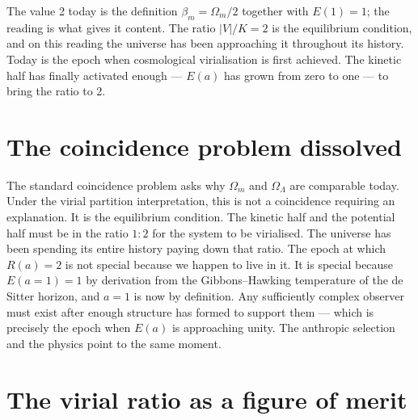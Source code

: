 The value 2 today is the definition $\beta_m=\Omega_m/2$ together with $E(1)=1$; the reading is what gives it content. The ratio $|V|/K=2$ is the
equilibrium condition, and on this reading the universe has been approaching it throughout its history. Today is the epoch when cosmological
virialisation is first achieved. The kinetic half has finally activated enough --- $E(a)$ has grown from zero to one --- to bring the ratio to 2. \interp

\section{The coincidence problem dissolved}\label{sec:vp_coincidence}
The standard coincidence problem asks why $\Omega_m$ and $\Omega_\Lambda$ are comparable today. Under the virial partition interpretation, this is not a
coincidence requiring an explanation. It is the equilibrium condition. The kinetic half and the potential half must be in the ratio $1:2$ for the system to
be virialised. The universe has been spending its entire history paying down that ratio. The epoch at which $R(a)=2$ is not special because we happen to
live in it. It is special because $E(a{=}1)=1$ by derivation from the Gibbons--Hawking temperature of the de Sitter horizon, and $a=1$ is now by
definition. Any sufficiently complex observer must exist after enough structure has formed to support them --- which is precisely the epoch when $E(a)$ is
approaching unity. The anthropic selection and the physics point to the same moment. \interp

\section{The virial ratio as a figure of merit}\label{sec:vp_merit}

